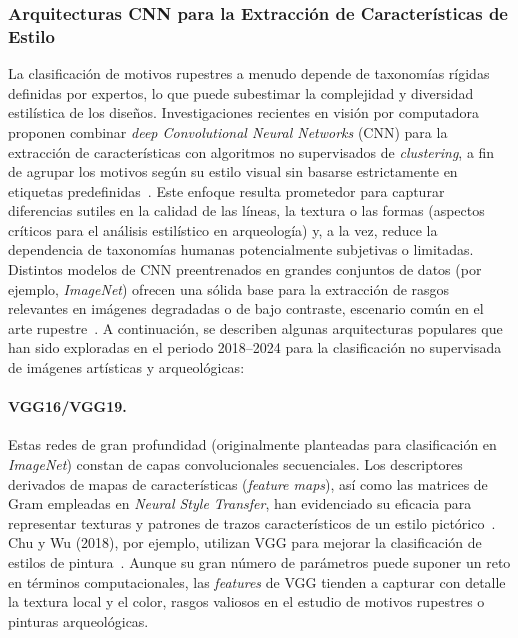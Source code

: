 \subsubsection{Arquitecturas CNN para la Extracción de Características de Estilo }
La clasificación de motivos rupestres a menudo depende de taxonomías rígidas definidas por expertos, lo que puede subestimar la complejidad y diversidad estilística de los diseños.
Investigaciones recientes en visión por computadora proponen combinar \textit{deep Convolutional Neural Networks} (CNN) para la extracción de características con algoritmos no supervisados de \textit{clustering}, a fin de agrupar los motivos según su estilo visual sin basarse estrictamente en etiquetas predefinidas~\cite{gairola2020}.
Este enfoque resulta prometedor para capturar diferencias sutiles en la calidad de las líneas, la textura o las formas (aspectos críticos para el análisis estilístico en arqueología) y, a la vez, reduce la dependencia de taxonomías humanas potencialmente subjetivas o limitadas.
Distintos modelos de CNN preentrenados en grandes conjuntos de datos (por ejemplo, \textit{ImageNet}) ofrecen una sólida base para la extracción de rasgos relevantes en imágenes degradadas o de bajo contraste, escenario común en el arte rupestre~\cite{guerin2018}.
A continuación, se describen algunas arquitecturas populares que han sido exploradas en el periodo 2018–2024 para la clasificación no supervisada de imágenes artísticas y arqueológicas:

\paragraph{VGG16/VGG19.}
Estas redes de gran profundidad (originalmente planteadas para clasificación en \textit{ImageNet}) constan de capas convolucionales secuenciales.
Los descriptores derivados de mapas de características (\textit{feature maps}), así como las matrices de Gram empleadas en \textit{Neural Style Transfer}, han evidenciado su eficacia para representar texturas y patrones de trazos característicos de un estilo pictórico~\cite{gairola2020}.
Chu y Wu (2018), por ejemplo, utilizan VGG para mejorar la clasificación de estilos de pintura~\cite{gairola2020}.
Aunque su gran número de parámetros puede suponer un reto en términos computacionales, las \textit{features} de VGG tienden a capturar con detalle la textura local y el color, rasgos valiosos en el estudio de motivos rupestres o pinturas arqueológicas.

